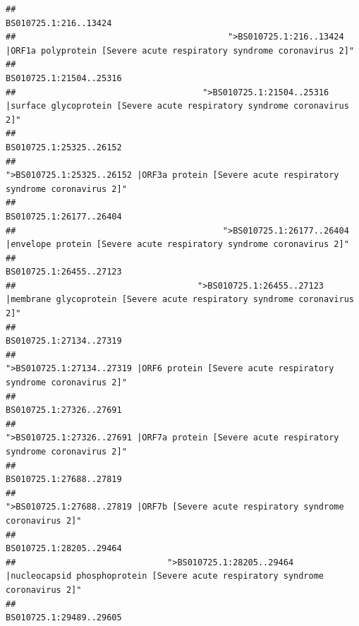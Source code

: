 \documentclass[
]{article}
\begin{document}
\begin{verbatim}
##                                                                                                                  BS010725.1:216..13424 
##                                          ">BS010725.1:216..13424 |ORF1a polyprotein [Severe acute respiratory syndrome coronavirus 2]" 
##                                                                                                                BS010725.1:21504..25316 
##                                     ">BS010725.1:21504..25316 |surface glycoprotein [Severe acute respiratory syndrome coronavirus 2]" 
##                                                                                                                BS010725.1:25325..26152 
##                                            ">BS010725.1:25325..26152 |ORF3a protein [Severe acute respiratory syndrome coronavirus 2]" 
##                                                                                                                BS010725.1:26177..26404 
##                                         ">BS010725.1:26177..26404 |envelope protein [Severe acute respiratory syndrome coronavirus 2]" 
##                                                                                                                BS010725.1:26455..27123 
##                                    ">BS010725.1:26455..27123 |membrane glycoprotein [Severe acute respiratory syndrome coronavirus 2]" 
##                                                                                                                BS010725.1:27134..27319 
##                                             ">BS010725.1:27134..27319 |ORF6 protein [Severe acute respiratory syndrome coronavirus 2]" 
##                                                                                                                BS010725.1:27326..27691 
##                                            ">BS010725.1:27326..27691 |ORF7a protein [Severe acute respiratory syndrome coronavirus 2]" 
##                                                                                                                BS010725.1:27688..27819 
##                                                    ">BS010725.1:27688..27819 |ORF7b [Severe acute respiratory syndrome coronavirus 2]" 
##                                                                                                                BS010725.1:28205..29464 
##                              ">BS010725.1:28205..29464 |nucleocapsid phosphoprotein [Severe acute respiratory syndrome coronavirus 2]" 
##                                                                                                                BS010725.1:29489..29605 

\end{verbatim}
\end{document}
